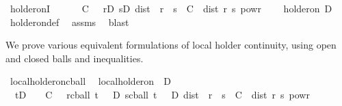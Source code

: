\begin{isabellebody}
{}%
{}\isamarkupfalse%
\ holder{\isacharunderscore}{\kern0pt}onI{\isacharcolon}{\kern0pt}\isanewline
\ \ \ {\isachardoublequoteopen}{\isasymgamma}\ {\isasymin}\ {\isacharbraceleft}{\kern0pt}{}{\isacharless}{\kern0pt}{\isachardot}{\kern0pt}{\isachardot}{\kern0pt}{}{\isacharbraceright}{\kern0pt}{\isachardoublequoteclose}\ {\isachardoublequoteopen}{\isasymexists}C\ {\isasymge}\ {}{\isachardot}{\kern0pt}\ {\isacharparenleft}{\kern0pt}{\isasymforall}r{\isasymin}D{\isachardot}{\kern0pt}\ {\isasymforall}s{\isasymin}D{\isachardot}{\kern0pt}\ dist\ {\isacharparenleft}{\kern0pt}{\isasymphi}\ r{\isacharparenright}{\kern0pt}\ {\isacharparenleft}{\kern0pt}{\isasymphi}\ s{\isacharparenright}{\kern0pt}\ {\isasymle}\ C\ {\isacharasterisk}{\kern0pt}\ dist\ r\ s\ powr\ {\isasymgamma}{\isacharparenright}{\kern0pt}{\isachardoublequoteclose}\isanewline
\ \ \ {\isachardoublequoteopen}{\isasymgamma}{\isacharminus}{\kern0pt}holder{\isacharunderscore}{\kern0pt}on\ D\ {\isasymphi}{\isachardoublequoteclose}\isanewline
%
\isadelimproof
\ \ %
\endisadelimproof
%
\isatagproof
{}\isamarkupfalse%
\ holder{\isacharunderscore}{\kern0pt}on{\isacharunderscore}{\kern0pt}def\ \isamarkupfalse%
\ assms\ \isamarkupfalse%
\ blast%
\endisatagproof
{\isafoldproof}%
%
\isadelimproof
%
\endisadelimproof
%
\begin{isamarkuptext}%
We prove various equivalent formulations of local holder continuity, using open and closed
  balls and inequalities.%
\end{isamarkuptext}\isamarkuptrue%
\isamarkupfalse%
\ local{\isacharunderscore}{\kern0pt}holder{\isacharunderscore}{\kern0pt}on{\isacharunderscore}{\kern0pt}cball{\isacharcolon}{\kern0pt}\isanewline
\ \ {\isachardoublequoteopen}local{\isacharunderscore}{\kern0pt}holder{\isacharunderscore}{\kern0pt}on\ {\isasymgamma}\ D\ {\isasymphi}\ {\isasymlongleftrightarrow}\ {\isasymgamma}\ {\isasymin}\ {\isacharbraceleft}{\kern0pt}{}{\isacharless}{\kern0pt}{\isachardot}{\kern0pt}{\isachardot}{\kern0pt}{}{\isacharbraceright}{\kern0pt}\ {\isasymand}\isanewline
\ \ {\isacharparenleft}{\kern0pt}{\isasymforall}t{\isasymin}D{\isachardot}{\kern0pt}\ {\isasymexists}{\isasymepsilon}\ {\isachargreater}{\kern0pt}\ {}{\isachardot}{\kern0pt}\ {\isasymexists}C\ {\isasymge}\ {}{\isachardot}{\kern0pt}\ {\isacharparenleft}{\kern0pt}{\isasymforall}r{\isasymin}cball\ t\ {\isasymepsilon}\ {\isasyminter}\ D{\isachardot}{\kern0pt}\ {\isasymforall}s{\isasymin}cball\ t\ {\isasymepsilon}\ {\isasyminter}\ D{\isachardot}{\kern0pt}\ dist\ {\isacharparenleft}{\kern0pt}{\isasymphi}\ r{\isacharparenright}{\kern0pt}\ {\isacharparenleft}{\kern0pt}{\isasymphi}\ s{\isacharparenright}{\kern0pt}\ {\isasymle}\ C\ {\isacharasterisk}{\kern0pt}\ dist\ r\ s\ powr\ {\isasymgamma}{\isacharparenright}{\kern0pt}{\isacharparenright}{\kern0pt}{\isachardoublequoteclose}\isanewline

\end{isabellebody}
